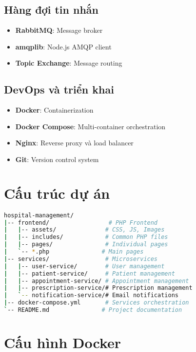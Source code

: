 \documentclass[12pt,a4paper]{report}
\begin{document}
\subsection{Hàng đợi tin nhắn}
\begin{itemize}
    \item \textbf{RabbitMQ}: Message broker
    \item \textbf{amqplib}: Node.js AMQP client
    \item \textbf{Topic Exchange}: Message routing
\end{itemize}

\subsection{DevOps và triển khai}
\begin{itemize}
    \item \textbf{Docker}: Containerization
    \item \textbf{Docker Compose}: Multi-container orchestration
    \item \textbf{Nginx}: Reverse proxy và load balancer
    \item \textbf{Git}: Version control system
\end{itemize}

\section{Cấu trúc dự án}

\begin{lstlisting}[language=bash]
hospital-management/
|-- frontend/                 # PHP Frontend
|   |-- assets/              # CSS, JS, Images
|   |-- includes/            # Common PHP files
|   |-- pages/               # Individual pages
|   `-- *.php               # Main pages
|-- services/                # Microservices
|   |-- user-service/        # User management
|   |-- patient-service/     # Patient management
|   |-- appointment-service/ # Appointment management
|   |-- prescription-service/# Prescription management
|   `-- notification-service/# Email notifications
|-- docker-compose.yml       # Services orchestration
`-- README.md               # Project documentation
\end{lstlisting}

\section{Cấu hình Docker}
\end{document}
